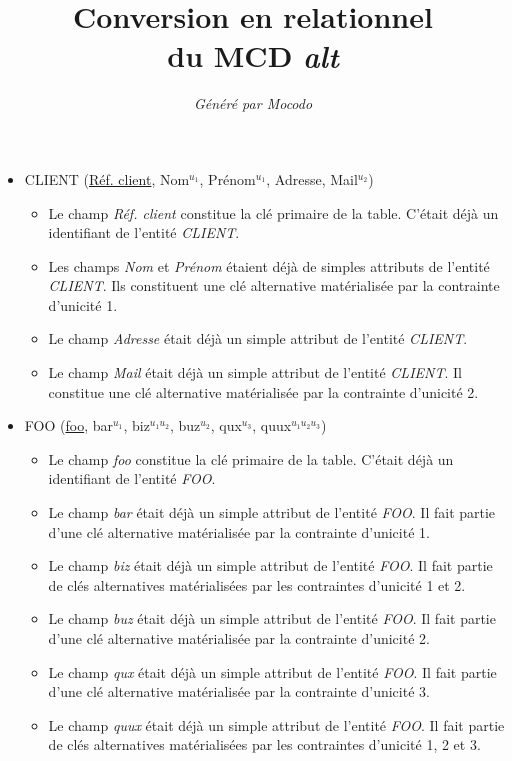 \documentclass[a4paper]{article}
\title{Conversion en relationnel\\du MCD \emph{alt}}
\author{\emph{Généré par Mocodo}}
\newcommand{\relat}[1]{\textsc{#1}}
\newcommand{\attr}[1]{#1}
\newcommand{\prim}[1]{\uline{#1}}
\begin{document}
\maketitle

\begin{itemize}
  \item \relat{CLIENT} (\prim{Réf. client}, \attr{Nom}$^{u_1}$, \attr{Prénom}$^{u_1}$, \attr{Adresse}, \attr{Mail}$^{u_2}$)
  \begin{itemize}
    \item Le champ \emph{Réf. client} constitue la clé primaire de la table. C'était déjà un identifiant de l'entité \emph{CLIENT}.
    \item Les champs \emph{Nom} et \emph{Prénom} étaient déjà de simples attributs de l'entité \emph{CLIENT}. Ils constituent une clé alternative matérialisée par la contrainte d'unicité 1.
    \item Le champ \emph{Adresse} était déjà un simple attribut de l'entité \emph{CLIENT}.
    \item Le champ \emph{Mail} était déjà un simple attribut de l'entité \emph{CLIENT}. Il constitue une clé alternative matérialisée par la contrainte d'unicité 2.
  \end{itemize}

  \item \relat{FOO} (\prim{foo}, \attr{bar}$^{u_1}$, \attr{biz}$^{u_1 u_2}$, \attr{buz}$^{u_2}$, \attr{qux}$^{u_3}$, \attr{quux}$^{u_1 u_2 u_3}$)
  \begin{itemize}
    \item Le champ \emph{foo} constitue la clé primaire de la table. C'était déjà un identifiant de l'entité \emph{FOO}.
    \item Le champ \emph{bar} était déjà un simple attribut de l'entité \emph{FOO}. Il fait partie d'une clé alternative matérialisée par la contrainte d'unicité 1.
    \item Le champ \emph{biz} était déjà un simple attribut de l'entité \emph{FOO}. Il fait partie de clés alternatives matérialisées par les contraintes d'unicité 1 et 2.
    \item Le champ \emph{buz} était déjà un simple attribut de l'entité \emph{FOO}. Il fait partie d'une clé alternative matérialisée par la contrainte d'unicité 2.
    \item Le champ \emph{qux} était déjà un simple attribut de l'entité \emph{FOO}. Il fait partie d'une clé alternative matérialisée par la contrainte d'unicité 3.
    \item Le champ \emph{quux} était déjà un simple attribut de l'entité \emph{FOO}. Il fait partie de clés alternatives matérialisées par les contraintes d'unicité 1, 2 et 3.
  \end{itemize}


\end{itemize}
\end{document}
